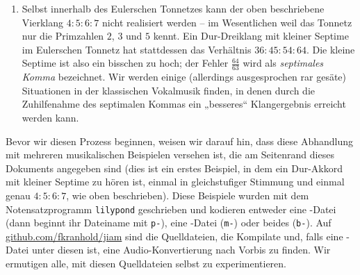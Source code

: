 \documentclass[ngerman,11pt]{scrartcl}
\begin{document}
\begin{enumerate}
\item Selbst innerhalb des Eulerschen Tonnetzes kann der oben beschriebene
  Vierklang $4:5:6:7$ nicht realisiert werden – im Wesentlichen weil das Tonnetz
  nur die Primzahlen $2$, $3$ und $5$ kennt. Ein Dur-Dreiklang mit kleiner
  Septime im Eulerschen Tonnetz hat stattdessen das Verhältnis $36:45:54:64$.
  Die kleine Septime ist also ein bisschen zu hoch; der Fehler $\frac{64}{63}$
  wird als \emph{septimales Komma} bezeichnet. Wir werden einige (allerdings
  ausgesprochen rar gesäte) Situationen in der klassischen Vokalmusik finden,
  in denen durch die Zuhilfenahme des septimalen Kommas ein „besseres“
  Klangergebnis erreicht werden kann.
\end{enumerate}


Bevor wir diesen Prozess beginnen, weisen wir darauf hin, dass diese Abhandlung
mit mehreren musikalischen Beispielen versehen ist, die am Seitenrand dieses
Dokuments angegeben sind (dies ist ein erstes Beispiel, in dem ein
Dur-Akkord mit kleiner Septime zu hören ist, einmal in gleichstufiger Stimmung
und einmal genau $4:5:6:7$, wie oben beschrieben). Diese Beispiele wurden mit
dem Notensatzprogramm \verb!lilypond! geschrieben und kodieren entweder eine
-Datei (dann beginnt ihr Dateiname mit \verb!p-!), eine
-Datei (\verb!m-!) oder beides (\verb!b-!). Auf
\href{https://github.com/fkranhold/jiam/}{\textsf{github.com/fkranhold/jiam}}
sind die Quelldateien, die Kompilate und, falls eine -Datei unter
diesen ist, eine Audio-Konvertierung nach  Vorbis zu finden. Wir
ermutigen alle, mit diesen Quelldateien selbst zu experimentieren.
\end{document}

